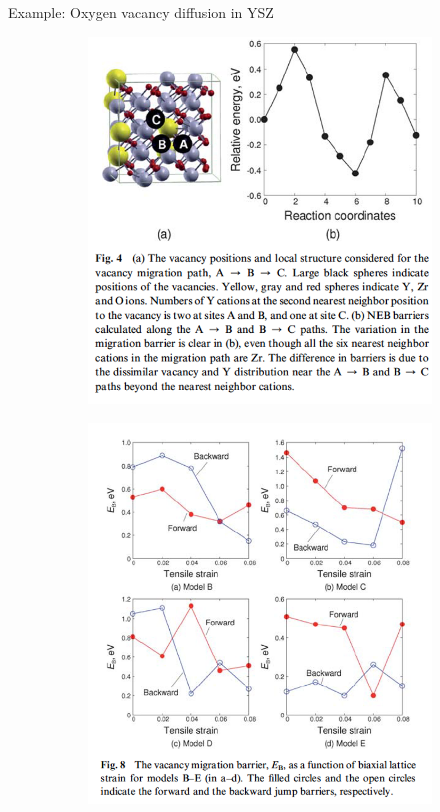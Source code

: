 \documentclass[aspectratio=169]{beamer}
\begin{document}
    \begin{frame}{Example: Oxygen vacancy diffusion in YSZ}
        \begin{figure}
            \centering
            \begin{subfigure}{0.45\textwidth}
                \centering
                \includegraphics[width=0.8\linewidth]{lectures/figures/12-O_diffusion_in_YSZ_1.png}
            \end{subfigure}
            \begin{subfigure}{0.45\textwidth}
                \centering
                \includegraphics[width=0.8\linewidth]{lectures/figures/12-O_diffusion_in_YSZ_2.png}
            \end{subfigure}
            \caption{\cite{kushimaOxygenIonDiffusivity2010}}
        \end{figure}
    \end{frame}
\end{document}
